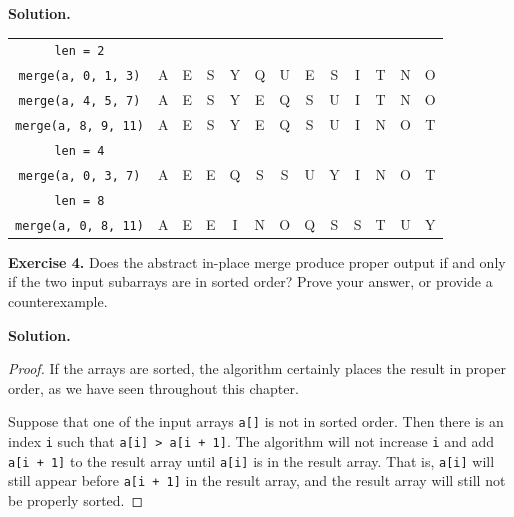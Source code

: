 \documentclass[12pt, a4paper]{article}
\newenvironment{ex}[2][Exercise]
{\par\medskip\noindent \textbf{#1 #2.}}
{\medskip}
\newenvironment{sol}[1][Solution]
{\par\medskip\noindent \textbf{#1.} }
{\medskip}
\begin{document}
\begin{sol}
\begin{center}
\begin{tabular}{c|cccccccccccc}
	\texttt{len = 2}\\
	
	\texttt{merge(a, {\color{red}0}, 1, {\color{red}3})}
	& {\color{black}A} & {\color{black}E} & {\color{black}S} & {\color{black}Y} & {\color{gray}Q} & {\color{gray}U}
	& {\color{gray}E} & {\color{gray}S} & {\color{gray}I} & {\color{gray}T} & {\color{gray}N} & {\color{gray}O}\\
	
	\texttt{merge(a, {\color{red}4}, 5, {\color{red}7})}
	& {\color{gray}A} & {\color{gray}E} & {\color{gray}S} & {\color{gray}Y} & {\color{black}E} & {\color{black}Q}
	& {\color{black}S} & {\color{black}U} & {\color{gray}I} & {\color{gray}T} & {\color{gray}N} & {\color{gray}O}\\
	
	\texttt{merge(a, {\color{red}8}, 9, {\color{red}11})}
	& {\color{gray}A} & {\color{gray}E} & {\color{gray}S} & {\color{gray}Y} & {\color{gray}E} & {\color{gray}Q}
	& {\color{gray}S} & {\color{gray}U} & {\color{black}I} & {\color{black}N} & {\color{black}O} & {\color{black}T}\\
	
	\texttt{len = 4}\\
	
	\texttt{merge(a, {\color{red}0}, 3, {\color{red}7})}
	& {\color{black}A} & {\color{black}E} & {\color{black}E} & {\color{black}Q} & {\color{black}S} & {\color{black}S}
	& {\color{black}U} & {\color{black}Y} & {\color{gray}I} & {\color{gray}N} & {\color{gray}O} & {\color{gray}T}\\
	
	\texttt{len = 8}\\
	
	\texttt{merge(a, {\color{red}0}, 8, {\color{red}11})}
	& A & E & E & I & N & O & Q & S & S & T & U & Y\\
			\end{tabular}
		\end{center}
	\end{sol}
	\begin{ex}{4}
		Does the abstract in-place merge produce proper output if and only if the
		two input subarrays are in sorted order? Prove your answer, or provide a counterexample.
	\end{ex}
	\begin{sol}
		\begin{proof}
			If the arrays are sorted, the algorithm certainly places the result in proper order,
			as we have seen throughout this chapter.
			
			Suppose that one of the input arrays \texttt{a[]} is not in sorted order. Then
			there is an index \texttt{i} such that \texttt{a[i] > a[i + 1]}. The algorithm
			will not increase \texttt{i} and add \texttt{a[i + 1]} to the result array
			until \texttt{a[i]} is in the result array. That is, \texttt{a[i]} will still
			appear before \texttt{a[i + 1]} in the result array, and the result array will
			still not be properly sorted.
		\end{proof}
	\end{sol}
\end{document}
